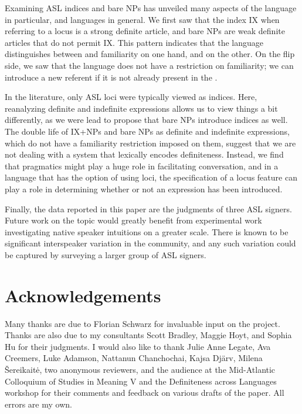 \documentclass[output=paper,
modfonts
]{langscibook}
\begin{document}
Examining ASL indices and bare NPs has unveiled many aspects of the language in particular, and languages in general. We first saw that the index IX when referring to a locus is a strong definite article, and bare NPs are weak definite articles that do not permit IX. This pattern indicates that the language distinguishes between  and familiarity on one hand, and  on the other. On the flip side, we saw that the language does not have a restriction on familiarity; we can introduce a new referent if it is not already present in the .  

In the literature, only ASL loci were typically viewed as indices. Here, reanalyzing definite and indefinite expressions allows us to view things a bit differently, as we were lead to propose that bare NPs introduce indices as well. The double life of IX+NPs and bare NPs as definite and indefinite expressions, which do not have a familiarity restriction imposed on them, suggest that we are not dealing with a system that lexically encodes definiteness. Instead, we find that pragmatics might play a huge role in facilitating conversation, and in a language that has the option of using loci, the specification of a locus feature can play a role in determining whether or not an expression has been introduced.

Finally, the data reported in this paper are the judgments of three ASL signers. Future work on the topic would greatly benefit from experimental work investigating native speaker intuitions on a greater scale. There is known to be significant interspeaker variation in the community, and any such variation could be captured by surveying a larger group of ASL signers. 

\section*{Acknowledgements}

Many thanks are due to Florian Schwarz for invaluable input on the project. Thanks are also due to my consultants Scott Bradley, Maggie Hoyt, and Sophia Hu for their judgments. I would also like to thank Julie Anne Legate, Ava Creemers, Luke Adamson, Nattanun Chanchochai, Kajsa Dj{\"a}rv, Milena \v{S}ereikait\.{e}, two anonymous reviewers, and the audience at the Mid-Atlantic Colloquium of Studies in Meaning V and the Definiteness across Languages workshop for their comments and feedback on various drafts of the paper. All errors are my own.

{\sloppy
\printbibliography[heading=subbibliography,notkeyword=this]
}
\end{document}
